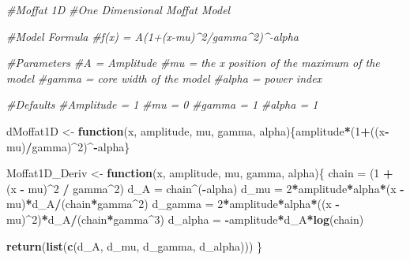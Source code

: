 \documentclass[
]{article}
\newenvironment{Shaded}{\begin{snugshade}}{\end{snugshade}}
\newcommand{\CommentTok}[1]{\textcolor[rgb]{0.56,0.35,0.01}{\textit{#1}}}
\newcommand{\ControlFlowTok}[1]{\textcolor[rgb]{0.13,0.29,0.53}{\textbf{#1}}}
\newcommand{\DecValTok}[1]{\textcolor[rgb]{0.00,0.00,0.81}{#1}}
\newcommand{\FunctionTok}[1]{\textcolor[rgb]{0.13,0.29,0.53}{\textbf{#1}}}
\newcommand{\NormalTok}[1]{#1}
\newcommand{\OtherTok}[1]{\textcolor[rgb]{0.56,0.35,0.01}{#1}}
\newcommand{\SpecialCharTok}[1]{\textcolor[rgb]{0.81,0.36,0.00}{\textbf{#1}}}
\begin{document}
\begin{Shaded}
\begin{Highlighting}[]
\CommentTok{\#Moffat 1D}
\CommentTok{\#One Dimensional Moffat Model}

\CommentTok{\#Model Formula}
\CommentTok{\#f(x) = A(1+(x{-}mu)\^{}2/gamma\^{}2)\^{}{-}alpha}

\CommentTok{\#Parameters}
\CommentTok{\#A = Amplitude}
\CommentTok{\#mu = the x position of the maximum of the model }
\CommentTok{\#gamma = core width of the model}
\CommentTok{\#alpha = power index}

\CommentTok{\#Defaults}
\CommentTok{\#Amplitude = 1}
\CommentTok{\#mu = 0}
\CommentTok{\#gamma = 1}
\CommentTok{\#alpha = 1}

\NormalTok{dMoffat1D }\OtherTok{\textless{}{-}} \ControlFlowTok{function}\NormalTok{(x, amplitude, mu, gamma, alpha)\{amplitude}\SpecialCharTok{*}\NormalTok{(}\DecValTok{1}\SpecialCharTok{+}\NormalTok{((x}\SpecialCharTok{{-}}\NormalTok{mu)}\SpecialCharTok{/}\NormalTok{gamma)}\SpecialCharTok{\^{}}\DecValTok{2}\NormalTok{)}\SpecialCharTok{\^{}{-}}\NormalTok{alpha\}}

\NormalTok{Moffat1D\_Deriv }\OtherTok{\textless{}{-}} \ControlFlowTok{function}\NormalTok{(x, amplitude, mu, gamma, alpha)\{}
\NormalTok{  chain }\OtherTok{=}\NormalTok{ (}\DecValTok{1} \SpecialCharTok{+}\NormalTok{ (x }\SpecialCharTok{{-}}\NormalTok{ mu)}\SpecialCharTok{\^{}}\DecValTok{2} \SpecialCharTok{/}\NormalTok{ gamma}\SpecialCharTok{\^{}}\DecValTok{2}\NormalTok{)}
\NormalTok{  d\_A }\OtherTok{=}\NormalTok{ chain}\SpecialCharTok{\^{}}\NormalTok{(}\SpecialCharTok{{-}}\NormalTok{alpha)}
\NormalTok{  d\_mu }\OtherTok{=} \DecValTok{2}\SpecialCharTok{*}\NormalTok{amplitude}\SpecialCharTok{*}\NormalTok{alpha}\SpecialCharTok{*}\NormalTok{(x }\SpecialCharTok{{-}}\NormalTok{ mu)}\SpecialCharTok{*}\NormalTok{d\_A}\SpecialCharTok{/}\NormalTok{(chain}\SpecialCharTok{*}\NormalTok{gamma}\SpecialCharTok{\^{}}\DecValTok{2}\NormalTok{)}
\NormalTok{  d\_gamma }\OtherTok{=} \DecValTok{2}\SpecialCharTok{*}\NormalTok{amplitude}\SpecialCharTok{*}\NormalTok{alpha}\SpecialCharTok{*}\NormalTok{((x }\SpecialCharTok{{-}}\NormalTok{ mu)}\SpecialCharTok{\^{}}\DecValTok{2}\NormalTok{)}\SpecialCharTok{*}\NormalTok{d\_A}\SpecialCharTok{/}\NormalTok{(chain}\SpecialCharTok{*}\NormalTok{gamma}\SpecialCharTok{\^{}}\DecValTok{3}\NormalTok{)}
\NormalTok{  d\_alpha }\OtherTok{=} \SpecialCharTok{{-}}\NormalTok{amplitude}\SpecialCharTok{*}\NormalTok{d\_A}\SpecialCharTok{*}\FunctionTok{log}\NormalTok{(chain)}
  
  \FunctionTok{return}\NormalTok{(}\FunctionTok{list}\NormalTok{(}\FunctionTok{c}\NormalTok{(d\_A, d\_mu, d\_gamma, d\_alpha)))}
\NormalTok{\}}
\end{Highlighting}
\end{Shaded}
\end{document}
